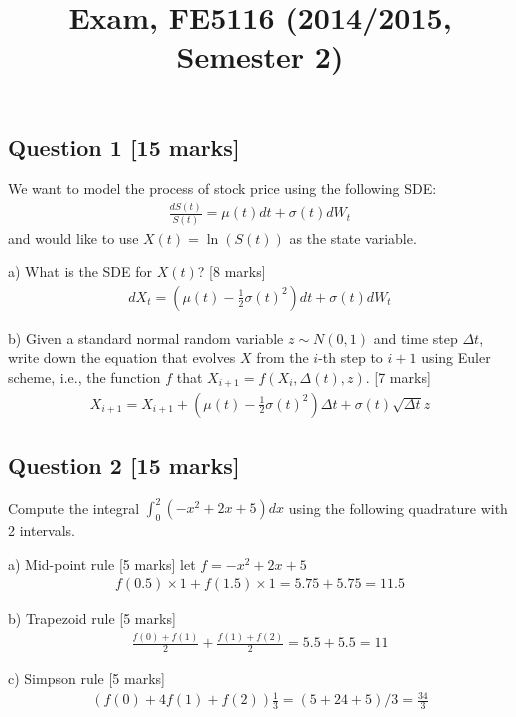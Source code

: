 \documentclass[11pt,a4paper,hidelinks,fleqn]{article}            %
\title{\vspace{-5ex}Exam, FE5116 (2014/2015, Semester 2)\vspace{-7ex}}
\date{}
\begin{document}
\maketitle
\subsection*{Question 1 [15 marks]} 
We want to model the process of stock price using the following SDE:
\begin{align*}
\frac{dS(t)}{S(t)} = \mu(t) dt + \sigma(t) dW_t
\end{align*}
and would like to use $X(t) = \ln(S(t))$ as the state variable.

a) What is the SDE for $X(t)$? [8 marks]
\begin{align*}
dX_t = (\mu(t) - \frac12 \sigma(t)^2) dt + \sigma(t) dW_t
\end{align*}

b) Given a standard normal random variable $z \sim N(0, 1)$ 
and time step $\Delta t$,
write down the equation that evolves $X$ from 
the $i$-th step to $i+1$ using Euler scheme, i.e., 
the function $f$ that $X_{i+1} = f(X_i, \Delta(t), z)$. [7 marks]
\begin{align*}
X_{i+1} = X_{i+1} + (\mu(t) - \frac12 \sigma(t)^2) \Delta t + \sigma(t) \sqrt{\Delta t} z
\end{align*}

\subsection*{Question 2 [15 marks]} 
Compute the integral $\int_0^2 (-x^2+2x+5) dx$ using the following quadrature with 2 intervals.

a) Mid-point rule [5 marks]
let $f = -x^2+2x+5$
\begin{align*}
f(0.5) \times 1 + f(1.5)\times 1 = 5.75 + 5.75 = 11.5
\end{align*}

b) Trapezoid rule [5 marks]
\begin{align*}
\frac{f(0) + f(1)}2 + \frac{f(1) + f(2)}2 = 5.5 + 5.5 = 11
\end{align*}

c) Simpson rule [5 marks]
\begin{align*}
(f(0) + 4f(1) + f(2)) \frac{1}{3} = (5 + 24 + 5) / 3 = \frac{34}3
\end{align*}
\end{document}
